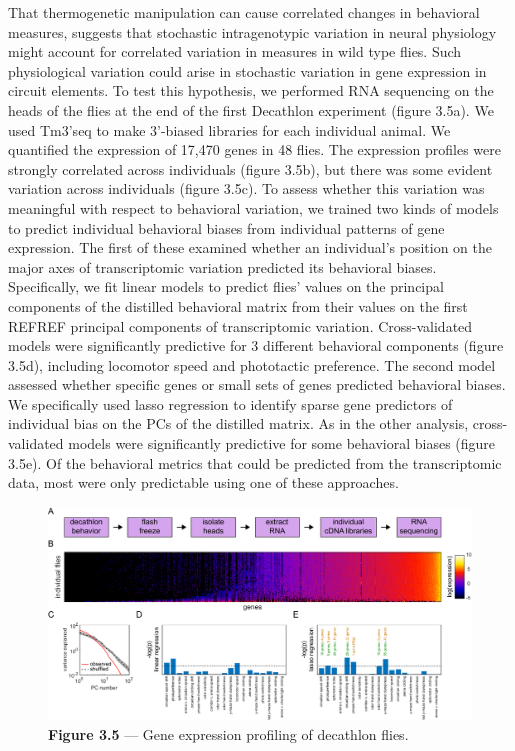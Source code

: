 \documentclass[12pt,letterpaper]{article}
\begin{document}
That thermogenetic manipulation can cause correlated changes in behavioral measures, suggests that stochastic intragenotypic variation in neural physiology might account for correlated variation in measures in wild type flies. Such physiological variation could arise in stochastic variation in gene expression \cite{Lin_Microenvironmental_2016} in circuit elements. To test this hypothesis, we performed RNA sequencing on the heads of the flies at the end of the first Decathlon experiment (figure 3.5a). We used Tm3’seq \cite{Pallares_TM3_2019} to make 3’-biased libraries for each individual animal. We quantified the expression of 17,470 genes in 48 flies. The expression profiles were strongly correlated across individuals (figure 3.5b), but there was some evident variation across individuals (figure 3.5c). To assess whether this variation was meaningful with respect to behavioral variation, we trained two kinds of models to predict individual behavioral biases from individual patterns of gene expression. The first of these examined whether an individual’s position on the major axes of transcriptomic variation predicted its behavioral biases. Specifically, we fit linear models to predict flies’ values on the principal components of the distilled behavioral matrix from their values on the first REFREF principal components of transcriptomic variation. Cross-validated models were significantly predictive for 3 different behavioral components (figure 3.5d), including locomotor speed and phototactic preference. The second model assessed whether specific genes or small sets of genes predicted behavioral biases. We specifically used lasso regression \cite{Santosa_Linear_1986,of_the_B_Regression_1996} to identify sparse gene predictors of individual bias on the PCs of the distilled matrix. As in the other analysis, cross-validated models were significantly predictive for some behavioral biases (figure 3.5e). Of the behavioral metrics that could be predicted from the transcriptomic data, most were only predictable using one of these approaches. 

\begin{figure}[t!]
    \includegraphics[width=\textwidth]{../figures/chapter_3/fig_3-5.pdf}
    \vspace{.05in}
    \caption*{\textbf{Figure 3.5} — Gene expression profiling of decathlon flies.}
\end{figure}
\end{document}
